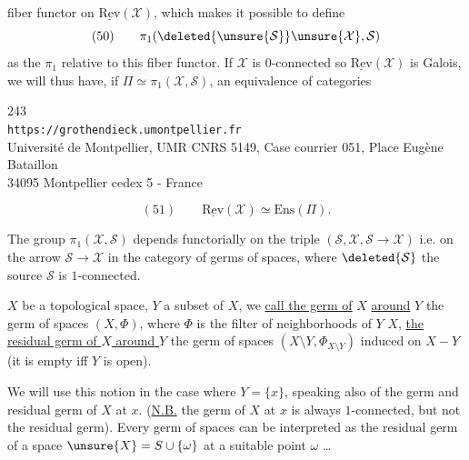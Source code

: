 fiber functor on $\underline{\mathrm{Rev}}(\mathcal X)$, which makes it possible to define
\[
(50)\qquad \pi_1(\deleted{\unsure{\mathcal S}}\unsure{\mathcal X},\mathcal S)
\]
as the $\pi_1$ relative to this fiber functor. If $\mathcal X$ is $0$-connected so $\underline{\mathrm{Rev}}(\mathcal X)$ is Galois, we will thus have, if $\Pi\simeq\pi_1(\mathcal X,\mathcal S)$, an equivalence of categories


\begin{center}
243\\
\texttt{https://grothendieck.umontpellier.fr}\\
Université de Montpellier, UMR CNRS 5149, Case courrier 051, Place Eugène Bataillon\\
34095 Montpellier cedex 5 - France
\end{center}


\[
(51)\qquad \underline{\mathrm{Rev}}(\mathcal X)\simeq\mathrm{Ens}(\Pi).
\]

The group $\pi_1(\mathcal X,\mathcal S)$ depends functorially on the triple $(\mathcal S,\mathcal X,\mathcal S\longrightarrow\mathcal X)$ i.e. on the arrow $\mathcal S\longrightarrow\mathcal X$ in the category of germs of spaces, where $\deleted{\mathcal S}$ the source $\mathcal S$ is $1$-connected.

 $X$ be a topological space, $Y$ a subset of $X$, we \uline{call the germ of} $X$ \uline{around} $Y$ the germ of spaces $(X,\Phi)$, where $\Phi$ is the filter of neighborhoods of $Y$  $X$, \uline{the residual germ of $X$ around $Y$} the germ of spaces $(X\setminus Y,\Phi_{X\setminus Y})$ induced on $X-Y$ (it is empty iff $Y$ is open).


We will use this notion  in the case where $Y=\{x\}$, speaking also of the germ and residual germ of $X$ at $x$. (\uline{N.B.} the germ of $X$ at $x$ is always  $1$-connected, but not the residual germ). Every germ of spaces  can be interpreted as the residual germ of a space  $\unsure{X}=S\cup\{\omega\}$ at a suitable point $\omega$ \ldots

